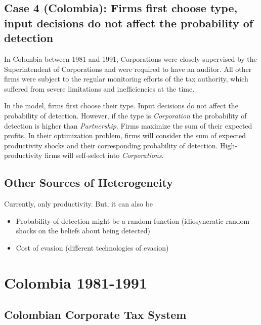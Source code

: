 \documentclass[
  12pt]{article}
\providecommand{\tightlist}{%
  \setlength{\itemsep}{0pt}\setlength{\parskip}{0pt}}\usepackage{longtable,booktabs,array}
\begin{document}
\hypertarget{case-4-colombia-firms-first-choose-type-input-decisions-do-not-affect-the-probability-of-detection}{%
\subsection{Case 4 (Colombia): Firms first choose type, input decisions
do not affect the probability of
detection}\label{case-4-colombia-firms-first-choose-type-input-decisions-do-not-affect-the-probability-of-detection}}

In Colombia between 1981 and 1991, Corporations were closely supervised
by the Superintendent of Corporations and were required to have an
auditor. All other firms were subject to the regular monitoring efforts
of the tax authority, which suffered from severe limitations and
inefficiencies at the time.

In the model, firms first choose their type. Input decisions do not
affect the probability of detection. However, if the type is
\emph{Corporation} the probability of detection is higher than
\emph{Partnership}. Firms maximize the sum of their expected profits. In
their optimization problem, firms will consider the sum of expected
productivity shocks and their corresponding probability of detection.
High-productivity firms will self-select into \emph{Corporations}.

\hypertarget{other-sources-of-heterogeneity}{%
\subsection{Other Sources of
Heterogeneity}\label{other-sources-of-heterogeneity}}

Currently, only productivity. But, it can also be

\begin{itemize}
\tightlist
\item
  Probability of detection might be a random function (idiosyncratic
  random shocks on the beliefs about being detected)
\item
  Cost of evasion (different technologies of evasion)
\end{itemize}

\hypertarget{colombia-1981-1991}{%
\section{Colombia 1981-1991}\label{colombia-1981-1991}}

\hypertarget{colombian-corporate-tax-system}{%
\subsection{Colombian Corporate Tax
System}\label{colombian-corporate-tax-system}}
\end{document}
